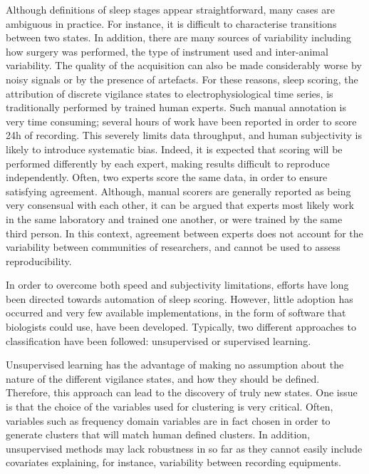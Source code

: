 Although definitions of sleep stages appear straightforward, many cases are ambiguous in practice.
For instance, it is difficult to characterise transitions between two states.
In addition, there are many sources of variability including how surgery was performed, the type of instrument used and inter-animal variability.
The quality of the acquisition can also be made considerably worse by noisy signals or by the presence of artefacts.
For these reasons, sleep scoring, \ie{} the attribution of discrete vigilance states to electrophysiological time series,
is traditionally performed by trained human experts.
Such manual annotation is very time consuming; several hours of work have been reported in order to score 24h of recording\cite{sunagawa_faster:_2013}.
This severely limits data throughput, and human subjectivity is likely to introduce systematic bias.
Indeed, it is expected that scoring will be performed differently by each expert, making results difficult to reproduce independently.
Often, two experts score the same data, in order to ensure satisfying agreement.
Although, manual scorers are generally reported as being very consensual with
each other\cite{costa-miserachs_automated_2003,sen_comparative_2014}, it can be
argued that experts most likely work in the same laboratory and trained one another, or were trained by the same third person.
In this context, agreement between experts does not account for the variability between communities of researchers, and cannot be used to assess reproducibility.

In order to overcome both speed and subjectivity limitations, efforts have long
been directed towards automation of sleep
scoring\cite{chouvet_automatic_1980, haustein_automatic_1986}.
However, little adoption has occurred and very few available implementations, in the form of software that biologists could use, have been developed.
Typically, two different approaches to classification have been followed: unsupervised or supervised learning.

Unsupervised learning \cite{langkvist_sleep_2012,sunagawa_faster:_2013} has the
advantage of making no assumption about the nature of the different vigilance states, and how they should be defined.
Therefore, this approach can lead to the discovery of truly new states.
One issue is that the choice of the variables used for clustering is very
critical.
Often, variables such as frequency domain variables are in fact chosen in order
to generate clusters that will match human defined clusters.
In addition, unsupervised methods may lack robustness\cite{sunagawa_faster:_2013} in so far as they
cannot easily include covariates explaining, for instance, variability between recording equipments.

